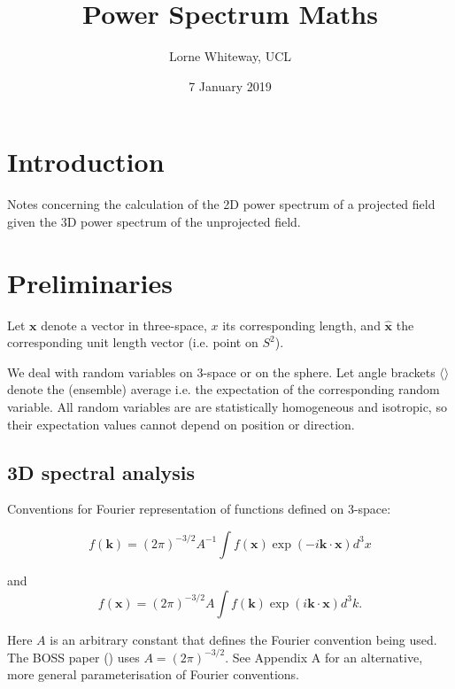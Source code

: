 \documentclass[11pt]{article}
\title{Power Spectrum Maths}
\author{Lorne Whiteway, UCL}
\date{7 January 2019}
\begin{document}
\maketitle

\section {Introduction}

Notes concerning the calculation of the 2D power spectrum of a projected field given the 3D power spectrum of the unprojected field.

\section {Preliminaries}

Let $\boldsymbol{x}$ denote a vector in three-space, $x$ its corresponding length, and $\boldsymbol{\hat{x}}$ the corresponding unit length vector (i.e. point on $S^2$).

We deal with random variables on 3-space or on the sphere. Let angle brackets $\langle \rangle $ denote the (ensemble) average i.e. the expectation of the corresponding random variable. All random variables are are statistically homogeneous and isotropic, so their expectation values cannot depend on position or direction.

\subsection{3D spectral analysis}

Conventions for Fourier representation of functions defined on 3-space:

\begin{equation}
f(\boldsymbol{k}) = (2\pi)^{-3/2} A^{-1} \int f(\boldsymbol{x}) \exp(-i \boldsymbol{k} \cdot \boldsymbol{x}) d^3x
\end{equation}

\noindent and
\begin{equation}
f(\boldsymbol{x}) = (2\pi)^{-3/2} A \int f(\boldsymbol{k}) \exp(i \boldsymbol{k} \cdot \boldsymbol{x}) d^3k.
\end{equation}

\noindent Here $A$ is an arbitrary constant that defines the Fourier convention being used. The BOSS paper (\cite{loureiro2019cosmological}) uses $A = (2\pi)^{-3/2}$. See \cite{matarrese1997large} Appendix A for an alternative, more general parameterisation of Fourier conventions. 
\end{document}
